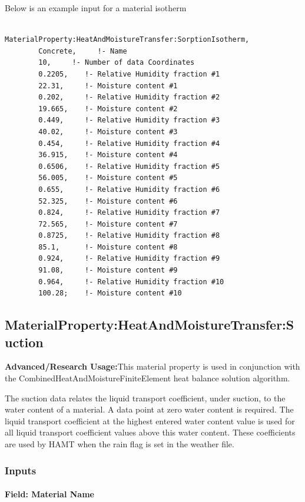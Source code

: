 Below is an example input for a material isotherm

\begin{lstlisting}

MaterialProperty:HeatAndMoistureTransfer:SorptionIsotherm,
        Concrete,     !- Name
        10,     !- Number of data Coordinates
        0.2205,    !- Relative Humidity fraction #1
        22.31,     !- Moisture content #1
        0.202,     !- Relative Humidity fraction #2
        19.665,    !- Moisture content #2
        0.449,     !- Relative Humidity fraction #3
        40.02,     !- Moisture content #3
        0.454,     !- Relative Humidity fraction #4
        36.915,    !- Moisture content #4
        0.6506,    !- Relative Humidity fraction #5
        56.005,    !- Moisture content #5
        0.655,     !- Relative Humidity fraction #6
        52.325,    !- Moisture content #6
        0.824,     !- Relative Humidity fraction #7
        72.565,    !- Moisture content #7
        0.8725,    !- Relative Humidity fraction #8
        85.1,      !- Moisture content #8
        0.924,     !- Relative Humidity fraction #9
        91.08,     !- Moisture content #9
        0.964,     !- Relative Humidity fraction #10
        100.28;    !- Moisture content #10
\end{lstlisting}

\subsection{MaterialProperty:HeatAndMoistureTransfer:Suction}\label{materialpropertyheatandmoisturetransfersuction}

\textbf{Advanced/Research Usage:}This material property is used in conjunction with the CombinedHeatAndMoistureFiniteElement heat balance solution algorithm.

The suction data relates the liquid transport coefficient, under suction, to the water content of a material. A data point at zero water content is required. The liquid transport coefficient at the highest entered water content value is used for all liquid transport coefficient values above this water content. These coefficients are used by HAMT when the rain flag is set in the weather file.

\subsubsection{Inputs}\label{inputs-9-022}

\paragraph{Field: Material Name}\label{field-material-name-2}

